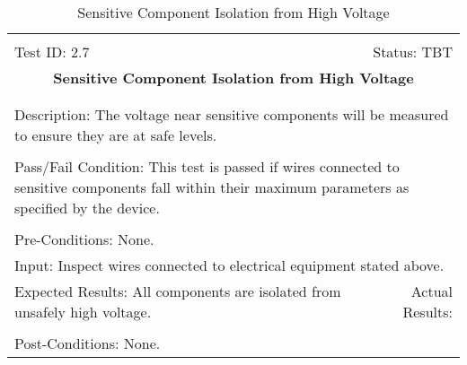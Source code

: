 \documentclass[titlepage]{article}
\begin{document}
\begin{center}%
\begin{table}
\begin{tabular}{|l r|}\hline&\\[-2mm]
	Test ID: 2.7	&Status: TBT\\[-3mm]
	\multicolumn{2}{|c|}{\textbf{\large{Sensitive Component Isolation from High Voltage}}}\\&\\\hline&\\[-3mm]
	\multicolumn{2}{|p{\textwidth}|}{Description: The voltage near sensitive components will be measured to ensure they are at safe levels.}\\[1mm]\hline&\\[-3mm]
	\multicolumn{2}{|p{\textwidth}|}{Pass/Fail Condition: This test is passed if wires connected to sensitive components fall within their maximum parameters as specified by the device.}\\[1mm]\hline&\\[-3mm]
	\multicolumn{2}{|p{\textwidth}|}{Pre-Conditions: None.}\\[4mm]
	\multicolumn{2}{|p{\textwidth}|}{Input: Inspect wires connected to electrical equipment stated above.}\\[2mm]\hline
	\multicolumn{1}{|p{0.49\textwidth}}{Expected Results: All components are isolated from unsafely high voltage.}	&\multicolumn{1}{|p{0.45\textwidth}|}{Actual Results:}\\\hline&\\[-3mm]
	\multicolumn{2}{|p{\textwidth}|}{Post-Conditions: None.}\\\hline
\end{tabular}
\caption{Sensitive Component Isolation from High Voltage}
\end{table}
\end{center}
\end{document}
